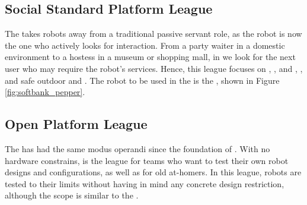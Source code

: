\subsection{Social Standard Platform League}

The  takes robots away from a traditional passive servant role, as the robot is now the one who actively looks for interaction.
From a party waiter in a domestic environment to a hostess in a museum or shopping mall, in  we look for the next user who may require the robot's services.
Hence, this league focuses on \HRI, \NLP, \PerDet{} and \PerRec, \AB, and safe outdoor \NAV{} and \MAP.
The robot to be used in the  is the \PEPPER, shown in Figure \ref{fig:softbank_pepper}.

\subsection{Open Platform League}

The  has had the same modus operandi since the foundation of \AtHome.
With no hardware constrains,  is the league for teams who want to test their own robot designs and configurations, as well as for old at-homers.
In this league, robots are tested to their limits without having in mind any concrete design restriction, although the scope is similar to the .
